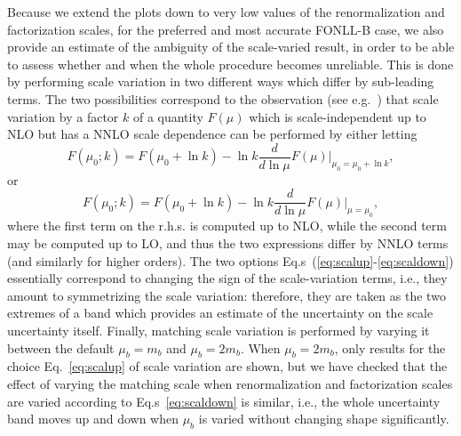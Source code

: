 \documentclass[12pt]{article}
\begin{document}
Because we extend the plots down to very low values of the
renormalization and factorization scales, for the preferred 
and most accurate  FONLL-B case,
we also provide an estimate
of the ambiguity of the scale-varied result, in order to be able to
assess whether and when the whole procedure becomes unreliable. This is done by
performing scale variation in
two different ways which differ by sub-leading terms. 
The two possibilities correspond to the
observation (see e.g.~\cite{Altarelli:2008aj})
that scale variation by a factor $k$ 
of a quantity $F(\mu)$ which is scale-independent up to NLO but has a
NNLO scale dependence can be performed by either letting
\begin{equation}\label{eq:scalup}
  F(\mu_0;k)=F(\mu_0+\ln k)- \ln k \frac{d}{d\ln\mu}
  F(\mu)\Big|_{\mu_0=\mu_0+\ln k},
\end{equation}
or
\begin{equation}\label{eq:scaldown}
  F(\mu_0;k)=F(\mu_0+\ln k)- \ln k \frac{d}{d\ln\mu} F(\mu)\Big|_{\mu=\mu_0},
\end{equation}
where the first term on the r.h.s. is computed up to NLO, while the
second term may be computed up to LO, and thus the two expressions
differ by NNLO terms (and similarly for higher orders). The two
options Eq.s~(\ref{eq:scalup}-\ref{eq:scaldown}) essentially correspond to
changing the sign of the scale-variation terms, i.e., they amount to
symmetrizing the scale variation: therefore, they are taken as the two
extremes of a band which provides an estimate of the 
uncertainty
on the scale uncertainty itself.
Finally, matching scale variation is performed by varying it between the
default $\mu_b=m_b$ and $\mu_b=2m_b$. When  $\mu_b=2m_b$, only results
for the choice Eq.~\ref{eq:scalup} of scale variation are shown, but
we have checked that the effect of varying the  matching scale when
renormalization and factorization scales
are varied according to  Eq.s~\ref{eq:scaldown} is similar, i.e., the
whole uncertainty band moves up and down when $\mu_b$ is varied
without changing shape significantly.
\end{document}
